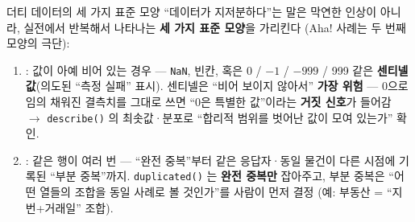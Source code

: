 \begin{frame}{더티 데이터의 세 가지 표준 모양}
  ``데이터가 지저분하다''는 말은 막연한 인상이 아니라, 실전에서
  반복해서 나타나는 \textbf{세 가지 표준 모양}을 가리킨다
  (Aha! 사례는 두 번째 모양의 극단):
  \begin{enumerate}
    \item {}: 값이 아예 비어 있는 경우
      --- \texttt{NaN}, 빈칸, 혹은 0 / $-1$ / $-999$ / 999 같은
      \textbf{센티넬 값}(의도된 ``측정 실패'' 표시). 센티넬은
      ``비어 보이지 않아서'' \textbf{가장 위험} --- 0으로 임의 채워진
      결측치를 그대로 쓰면 ``0은 특별한 값''이라는 \textbf{거짓 신호}가
      들어감 $\to$ \texttt{describe()} 의 최솟값·분포로 ``합리적
      범위를 벗어난 값이 모여 있는가'' 확인.
    \item {}: 같은 행이 여러 번 --- ``완전
      중복''부터 같은 응답자·동일 물건이 다른 시점에 기록된
      ``부분 중복''까지. \texttt{duplicated()} 는 \textbf{완전
      중복만} 잡아주고, 부분 중복은 ``어떤 열들의 조합을 동일 사례로
      볼 것인가''를 사람이 먼저 결정 (예: 부동산 = ``지번+거래일''
      조합).
  \end{enumerate}
\end{frame}
